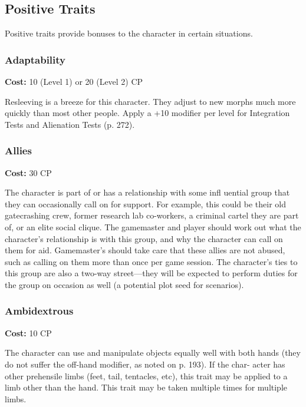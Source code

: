 \subsection{Positive Traits}

Positive traits provide bonuses to the character in 
certain situations.

\subsubsection{Adaptability}

\textbf{Cost:} 10 (Level 1) or 20 (Level 2) CP

Resleeving is a breeze for this character. They adjust 
to new morphs much more quickly than most other 
people. Apply a +10 modifier per level for Integration 
Tests and Alienation Tests (p. 272).

\subsubsection{Allies}

\textbf{Cost:} 30 CP

The character is part of or has a relationship with 
some infl uential group that they can occasionally call 
on for support. For example, this could be their old 
gatecrashing crew, former research lab co-workers, 
a criminal cartel they are part of, or an elite social 
clique. The gamemaster and player should work out 
what the character's relationship is with this group, 
and why the character can call on them for aid. 
Gamemaster's should take care that these allies are 
not abused, such as calling on them more than once 
per game session. The character's ties to this group 
are also a two-way street—they will be expected to 
perform duties for the group on occasion as well (a 
potential plot seed for scenarios).

\subsubsection{Ambidextrous}

\textbf{Cost:} 10 CP

The character can use and manipulate objects 
equally well with both hands (they do not suffer the 
off-hand modifier, as noted on p. 193). If the char-
acter has other prehensile limbs (feet, tail, tentacles, 
etc), this trait may be applied to a limb other than 
the hand. This trait may be taken multiple times for 
multiple limbs.

